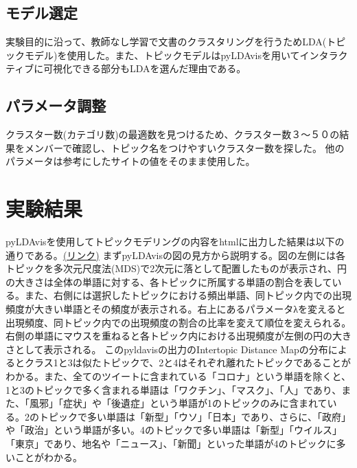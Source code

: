 \documentclass[a4paper, 11pt, titlepage]{jsarticle}
\begin{document}
\subsection{モデル選定}
実験目的に沿って、教師なし学習で文書のクラスタリングを行うためLDA(トピックモデル)を使用した。また、トピックモデルはpyLDAvisを用いてインタラクティブに可視化できる部分もLDAを選んだ理由である。 

\subsection{パラメータ調整}
クラスター数(カテゴリ数)の最適数を見つけるため、クラスター数３〜５０の結果をメンバーで確認し、トピック名をつけやすいクラスター数を探した。
他のパラメータは参考にしたサイトの値をそのまま使用した\cite{LDA}。

\section{実験結果}
pyLDAvisを使用してトピックモデリングの内容をhtmlに出力した結果は以下の通りである。\href{https://ie.u-ryukyu.ac.jp/~e205759/pyldavis_output.html}{(リンク)}
まずpyLDAvisの図の見方から説明する。図の左側には各トピックを多次元尺度法(MDS)で2次元に落として配置したものが表示され、円の大きさは全体の単語に対する、各トピックに所属する単語の割合を表している。また、右側には選択したトピックにおける頻出単語、同トピック内での出現頻度が大きい単語とその頻度が表示される。右上にあるパラメータλを変えると出現頻度、同トピック内での出現頻度の割合の比率を変えて順位を変えられる。右側の単語にマウスを重ねると各トピック内における出現頻度が左側の円の大きさとして表示される。
このpyldavisの出力のIntertopic Distance Mapの分布によるとクラス1と3は似たトピックで、2と4はそれぞれ離れたトピックであることがわかる。また、全てのツイートに含まれている「コロナ」という単語を除くと、1と3のトピックで多く含まれる単語は「ワクチン」、「マスク」、「人」であり、また、「風邪」「症状」や「後遺症」という単語が1のトピックのみに含まれている。2のトピックで多い単語は「新型」「ウソ」「日本」であり、さらに、「政府」や「政治」という単語が多い。4のトピックで多い単語は「新型」「ウイルス」「東京」であり、地名や「ニュース」、「新聞」といった単語が4のトピックに多いことがわかる。
\end{document}
